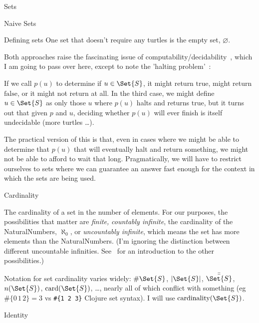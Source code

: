 \begin{plSection}{Sets}
\begin{plSection}{Naive Sets}
\begin{plSection}{Defining sets}
One set that doesn't require any turtles is 
the empty set, $\varnothing$.


Both approaches raise the fascinating issue of 
computability/decidability~\cite{Church:1936:Unsolvable,
Turing:1936:Computability,
Turing:1938:ComputabilityCorrection,
Turing:1937:ComputabilityLambda},
which I am going to pass over here, except to note the 
'halting problem'~\cite{wiki:HaltingProblem}:

If we call $p(u)$ to determine if $u \in \Set{S}$, 
it might return $\text{true}$, might return $\text{false}$,
or it might not return at all.
In the third case, we might define $u \in \Set{S}$ as only those
$u$ where $p(u)$ halts and returns $\text{true}$, but it turns 
out that given $p$ and $u$, deciding whether $p(u)$ will ever
finish is itself undecidable (more turtles \ldots).

The practical version of this is that, even in cases where we
might be able to determine that $p(u)$ that will eventually halt
and return something, we might not be able to afford to wait that
long.
Pragmatically, we will have to restrict ourselves to sets where we
can guarantee an answer fast enough for the context in which the
sets are being used.

\end{plSection}%
\begin{plSection}{Cardinality}

The cardinality of a set in the number of elements.
For our purposes, the possibilities that matter are \emph{finite,}
\emph{countably infinite}, the cardinality of the
\gls{NaturalNumbers}, $\aleph_{0}$, or \emph{uncountably
infinite}, which means the set has more elements than the
\gls{NaturalNumbers}.
(I'm ignoring the distinction between different uncountable
infinities.
See~\cite{wiki:CardinalNumbers} for an introduction to the other
possibilities.)

Notation for set cardinality varies widely:
$\#\Set{S}$,  $|\Set{S}|$,
$\bar{\bar{\Set{S}}}$, $n(\Set{S})$,
$\text{card}(\Set{S})$, \ldots, nearly all of which conflict
with something (eg $\#\{ 0 \, 1 \, 2 \} = 3$ vs 
\lstinline|#{1 2 3}| Clojure set syntax).
I will use $\text{cardinality}(\Set{S})$.

\end{plSection}%
\begin{plSection}{Identity}


\end{plSection}
\end{plSection}
\end{plSection}
